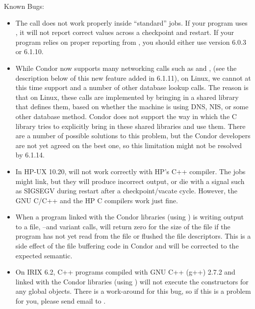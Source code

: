 \noindent Known Bugs:

\begin{itemize}

\item The  call does not work properly inside
``standard'' jobs.  
If your program uses , it will not report correct values
across a checkpoint and restart.
If your program relies on proper reporting from , you
should either use version 6.0.3 or 6.1.10.

\item While Condor now supports many networking calls such as
 and , (see the description below of this
new feature added in 6.1.11), on Linux, we cannot at this time support
 and a number of other database lookup calls.
The reason is that on Linux, these calls are implemented by bringing in a
shared library that defines them, based on whether the machine is using
DNS, NIS, or some other database method.
Condor does not support the way in which the C library tries to explicitly
bring in these shared libraries and use them.
There are a number of possible solutions to this problem, but the Condor
developers are not yet agreed on the best one, so this limitation might not
be resolved by 6.1.14.

\item In HP-UX 10.20,  will not work correctly with HP's
C++ compiler. 
The jobs might link, but they will produce incorrect output, or die with
a signal such as SIGSEGV during restart after a checkpoint/vacate cycle.
However, the GNU C/C++ and the HP C compilers work just fine.

\item When a program linked with the Condor libraries (using )
is writing output to a file, --and variant calls,
will return zero for the size of the file if the program has not yet
read from the file or flushed the file descriptors.
This is a side effect of the file buffering code in Condor and will be
corrected to the expected semantic.

\item On IRIX 6.2, C++ programs compiled with GNU C++ (g++) 2.7.2 and
linked with the Condor libraries (using ) will not
execute the constructors for any global objects.
There is a work-around for this bug, so if this is a problem for you,
please send email to .

\end{itemize}
